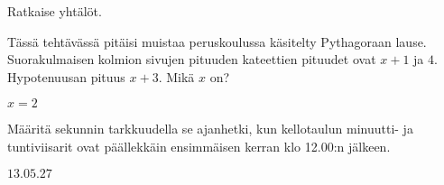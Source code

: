 \begin{tehtavasivu}
\begin{tehtava}
    Ratkaise yhtälöt.
    \begin{alakohdat}
    \end{alakohdat}
    \begin{vastaus}
        \begin{alakohdat}
        \end{alakohdat}
    \end{vastaus}
\end{tehtava}

\begin{tehtava}
    Tässä tehtävässä pitäisi muistaa peruskoulussa käsitelty Pythagoraan lause.
    Suorakulmaisen kolmion sivujen pituuden kateettien pituudet ovat $x+1$ ja $4$. Hypotenuusan pituus $x+3$. Mikä $x$ on?
    \begin{vastaus}
		$x=2$
    \end{vastaus}
\end{tehtava}

\begin{tehtava}
    Määritä sekunnin tarkkuudella se ajanhetki, kun kellotaulun minuutti- ja tuntiviisarit ovat päällekkäin ensimmäisen kerran klo 12.00:n jälkeen.
    \begin{vastaus}
		$13.05.27$
    \end{vastaus}
\end{tehtava}

\end{tehtavasivu}
